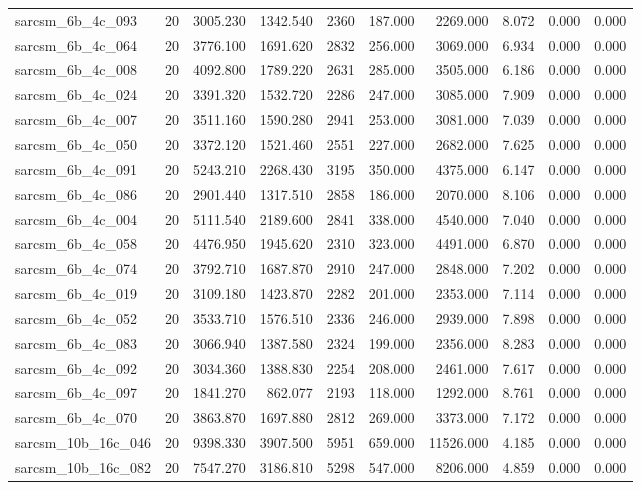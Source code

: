 \begin{tabular}{lrrrrrrrrr}
sarcsm\_6b\_4c\_093 & 20 & 3005.230 & 1342.540 & 2360 & 187.000 & 2269.000 & 8.072 & 0.000 & 0.000 \\
sarcsm\_6b\_4c\_064 & 20 & 3776.100 & 1691.620 & 2832 & 256.000 & 3069.000 & 6.934 & 0.000 & 0.000 \\
sarcsm\_6b\_4c\_008 & 20 & 4092.800 & 1789.220 & 2631 & 285.000 & 3505.000 & 6.186 & 0.000 & 0.000 \\
sarcsm\_6b\_4c\_024 & 20 & 3391.320 & 1532.720 & 2286 & 247.000 & 3085.000 & 7.909 & 0.000 & 0.000 \\
sarcsm\_6b\_4c\_007 & 20 & 3511.160 & 1590.280 & 2941 & 253.000 & 3081.000 & 7.039 & 0.000 & 0.000 \\
sarcsm\_6b\_4c\_050 & 20 & 3372.120 & 1521.460 & 2551 & 227.000 & 2682.000 & 7.625 & 0.000 & 0.000 \\
sarcsm\_6b\_4c\_091 & 20 & 5243.210 & 2268.430 & 3195 & 350.000 & 4375.000 & 6.147 & 0.000 & 0.000 \\
sarcsm\_6b\_4c\_086 & 20 & 2901.440 & 1317.510 & 2858 & 186.000 & 2070.000 & 8.106 & 0.000 & 0.000 \\
sarcsm\_6b\_4c\_004 & 20 & 5111.540 & 2189.600 & 2841 & 338.000 & 4540.000 & 7.040 & 0.000 & 0.000 \\
sarcsm\_6b\_4c\_058 & 20 & 4476.950 & 1945.620 & 2310 & 323.000 & 4491.000 & 6.870 & 0.000 & 0.000 \\
sarcsm\_6b\_4c\_074 & 20 & 3792.710 & 1687.870 & 2910 & 247.000 & 2848.000 & 7.202 & 0.000 & 0.000 \\
sarcsm\_6b\_4c\_019 & 20 & 3109.180 & 1423.870 & 2282 & 201.000 & 2353.000 & 7.114 & 0.000 & 0.000 \\
sarcsm\_6b\_4c\_052 & 20 & 3533.710 & 1576.510 & 2336 & 246.000 & 2939.000 & 7.898 & 0.000 & 0.000 \\
sarcsm\_6b\_4c\_083 & 20 & 3066.940 & 1387.580 & 2324 & 199.000 & 2356.000 & 8.283 & 0.000 & 0.000 \\
sarcsm\_6b\_4c\_092 & 20 & 3034.360 & 1388.830 & 2254 & 208.000 & 2461.000 & 7.617 & 0.000 & 0.000 \\
sarcsm\_6b\_4c\_097 & 20 & 1841.270 & 862.077 & 2193 & 118.000 & 1292.000 & 8.761 & 0.000 & 0.000 \\
sarcsm\_6b\_4c\_070 & 20 & 3863.870 & 1697.880 & 2812 & 269.000 & 3373.000 & 7.172 & 0.000 & 0.000 \\
sarcsm\_10b\_16c\_046 & 20 & 9398.330 & 3907.500 & 5951 & 659.000 & 11526.000 & 4.185 & 0.000 & 0.000 \\
sarcsm\_10b\_16c\_082 & 20 & 7547.270 & 3186.810 & 5298 & 547.000 & 8206.000 & 4.859 & 0.000 & 0.000 \\

\end{tabular}
